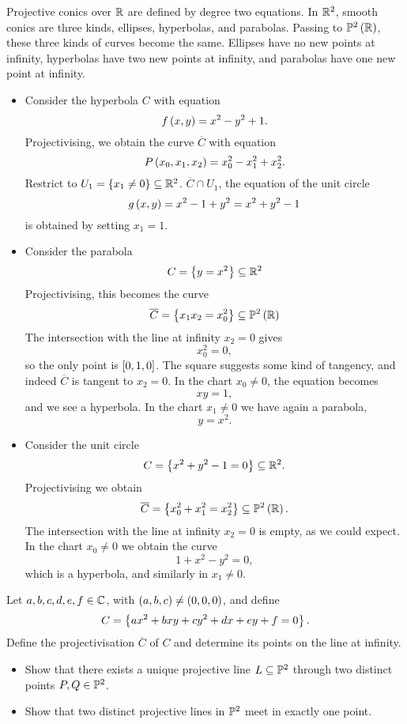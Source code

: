 \begin{example}
Projective conics over $ \R $ are defined by degree two equations. In $ \R^2 $, smooth conics are three kinds, ellipses, hyperbolas, and parabolas. Passing to $ \P^2\rb{\R} $, these three kinds of curves become the same. Ellipses have no new points at infinity, hyperbolas have two new points at infinity, and parabolas have one new point at infinity.
\begin{itemize}
\item Consider the hyperbola $ C $ with equation
$$ f\rb{x, y} = x^2 - y^2 + 1. $$
Projectivising, we obtain the curve $ \overline{C} $ with equation
$$ P\rb{x_0, x_1, x_2} = x_0^2 - x_1^2 + x_2^2. $$
Restrict to $ U_1 = \cb{x_1 \ne 0} \subseteq \R^2 $. $ \overline{C} \cap U_1 $, the equation of the unit circle
$$ g\rb{x, y} = x^2 - 1 + y^2 = x^2 + y^2 - 1 $$
is obtained by setting $ x_1 = 1 $.
\item Consider the parabola
$$ C = \cb{y = x^2} \subseteq \R^2 $$
Projectivising, this becomes the curve
$$ \overline{C} = \cb{x_1x_2 = x_0^2} \subseteq \P^2\rb{\R} $$
The intersection with the line at infinity $ x_2 = 0 $ gives
$$ x_0^2 = 0, $$
so the only point is $ \sb{0, 1, 0} $. The square suggests some kind of tangency, and indeed $ \overline{C} $ is tangent to $ x_2 = 0 $. In the chart $ x_0 \ne 0 $, the equation becomes
$$ xy = 1, $$
and we see a hyperbola. In the chart $ x_1 \ne 0 $ we have again a parabola,
$$ y = x^2. $$
\item Consider the unit circle
$$ C = \cb{x^2 + y^2 - 1 = 0} \subseteq \R^2. $$
Projectivising we obtain
$$ \overline{C} = \cb{x_0^2 + x_1^2 = x_2^2} \subseteq \P^2\rb{\R}. $$
The intersection with the line at infinity $ x_2 = 0 $ is empty, as we could expect. In the chart $ x_0 \ne 0 $ we obtain the curve
$$ 1 + x^2 - y^2 = 0, $$
which is a hyperbola, and similarly in $ x_1 \ne 0 $.
\end{itemize}
\end{example}

\begin{exercise}
Let $ a, b, c, d, e, f \in \C $, with $ \rb{a, b, c} \ne \rb{0, 0, 0} $, and define
$$ C = \cb{ax^2 + bxy + cy^2 + dx + ey + f = 0}. $$
Define the projectivisation $ \overline{C} $ of $ C $ and determine its points on the line at infinity.
\end{exercise}

\begin{exercise}
\label{ex:18}
\hfill
\begin{itemize}
\item Show that there exists a unique projective line $ L \subseteq \P^2 $ through two distinct points $ P, Q \in \P^2 $.
\item Show that two distinct projective lines in $ \P^2 $ meet in exactly one point.
\end{itemize}
\end{exercise}

